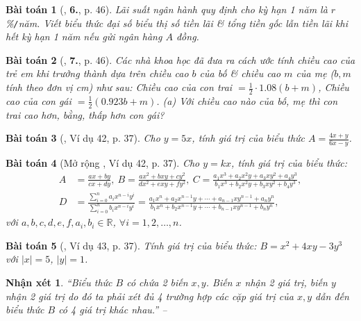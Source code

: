 \documentclass{article}
\numberwithin{equation}{section}
\newtheorem{baitoan}{Bài toán}
\newtheorem{nhanxet}{Nhận xét}[section]
\begin{document}
\begin{baitoan}[\cite{SGK_Toan_7_Canh_Dieu_tap_2}, \textbf{6.}, p. 46]
	Lãi suất ngân hành quy định cho kỳ hạn 1 năm là $r$\%\emph{\texttt{/}}năm. Viết biểu thức đại số biểu thị số tiền lãi \& tổng tiền gốc lẫn tiền lãi khi hết kỳ hạn 1 năm nếu gửi ngân hàng $A$ đồng.
\end{baitoan}

\begin{baitoan}[\cite{SGK_Toan_7_Canh_Dieu_tap_2}, \textbf{7.}, p. 46]
	Các nhà khoa học đã đưa ra cách ước tính chiều cao của trẻ em khi trưởng thành dựa trên chiều cao $b$ của bố \& chiều cao $m$ của mẹ ($b,m$ tính theo đơn vị cm) như sau: Chiều cao của con trai $= \frac{1}{2}\cdot1.08(b + m)$, Chiều cao của con gái $= \frac{1}{2}(0.923b + m)$. (a) Với chiều cao nào của bố, mẹ thì con trai cao hơn, bằng, thấp hơn con gái?
\end{baitoan}

\begin{baitoan}[\cite{Tuyen_Toan_7}, Ví dụ 42, p. 37]
	Cho $y = 5x$, tính giá trị của biểu thức $A = \frac{4x + y}{6x - y}$.
\end{baitoan}

\begin{baitoan}[Mở rộng \cite{Tuyen_Toan_7}, Ví dụ 42, p. 37]
	\label{mo rong Tuyen_Toan_7 vi du 42}
	Cho $y = kx$, tính giá trị của biểu thức:
	\begin{align*}
		A &= \frac{ax + by}{cx + dy},\ B = \frac{ax^2 + bxy + cy^2}{dx^2 + exy + fy^2},\ C = \frac{a_1x^3 + a_2x^2y + a_3xy^2 + a_4y^3}{b_1x^3 + b_2x^2y + b_3xy^2 + b_4y^3},\\
		D &= \frac{\sum_{i=0}^n a_ix^{n-i}y^i}{\sum_{i=0}^n b_ix^{n-i}y^i} = \frac{a_1x^n + a_2x^{n-1}y + \cdots + a_{n-1}xy^{n-1} + a_ny^n}{b_1x^n + b_2x^{n-1}y + \cdots + b_{n-1}xy^{n-1} + b_ny^n},
	\end{align*}
	với $a,b,c,d,e,f,a_i,b_i\in\mathbb{R}$, $\forall i = 1,2,\ldots,n$.
\end{baitoan}

\begin{baitoan}[\cite{Tuyen_Toan_7}, Ví dụ 43, p. 37]
	Tính giá trị của biểu thức: $B = x^2 + 4xy - 3y^3$ với $|x| = 5$, $|y| = 1$.
\end{baitoan}

\begin{nhanxet}
	``Biểu thức $B$ có chứa 2 biến $x,y$. Biến $x$ nhận 2 giá trị, biến $y$ nhận 2 giá trị do đó ta phải xét đủ 4 trường hợp các cặp giá trị của $x,y$ dẫn đến biểu thức $B$ có 4 giá trị khác nhau.'' -- \cite[p. 38]{Tuyen_Toan_7}
\end{nhanxet}
\end{document}
